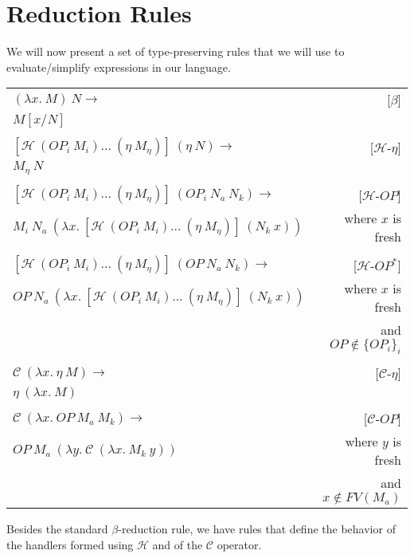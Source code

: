 \section{Reduction Rules}

We will now present a set of type-preserving rules that we will use to
evaluate/simplify expressions in our language.

\vspace{3mm}

\begin{tabular}{lr}
  $(\lambda x.\ M)\ N \rightarrow$ & [$\beta$] \\
  $M[x/N]$ & \\
  \\
  $[\mathcal{H}\ (OP_i\ M_i)\ldots\ (\eta\ M_\eta)]\ (\eta\ N) \rightarrow$ & [$\mathcal{H}$-$\eta$] \\
  $M_\eta\ N$ & \\
  \\
  $[\mathcal{H}\ (OP_i\ M_i)\ldots\ (\eta\ M_\eta)]\ (OP_i\ N_a\ N_k) \rightarrow$ & [$\mathcal{H}$-$OP$] \\
  $M_i\ N_a\ (\lambda x.\ [\mathcal{H}\ (OP_i\ M_i)\ldots\ (\eta\ M_\eta)]\ (N_k\ x))$ & where $x$ is fresh \\
  \\
  $[\mathcal{H}\ (OP_i\ M_i)\ldots\ (\eta\ M_\eta)]\ (OP\ N_a\ N_k) \rightarrow$ & [$\mathcal{H}$-$OP^*$] \\
  $OP\ N_a\ (\lambda x.\ [\mathcal{H}\ (OP_i\ M_i)\ldots\ (\eta\ M_\eta)]\ (N_k\ x))$ & where $x$ is fresh \\
  & and $OP \notin \{OP_i\}_i$ \\
  \\
  $\mathcal{C}\ (\lambda x.\ \eta\ M) \rightarrow$ & [$\mathcal{C}$-$\eta$] \\
  $\eta\ (\lambda x.\ M)$ & \\
  \\
  $\mathcal{C}\ (\lambda x.\ OP\ M_a\ M_k) \rightarrow$ & [$\mathcal{C}$-$OP$] \\
  $OP\ M_a\ (\lambda y.\ \mathcal{C}\ (\lambda x.\ M_k\ y))$ & where $y$ is fresh \\
  & and $x \notin FV(M_a)$
\end{tabular}

\vspace{3mm}

Besides the standard $\beta$-reduction rule, we have rules that define the
behavior of the handlers formed using $\mathcal{H}$ and of the
$\mathcal{C}$ operator.

